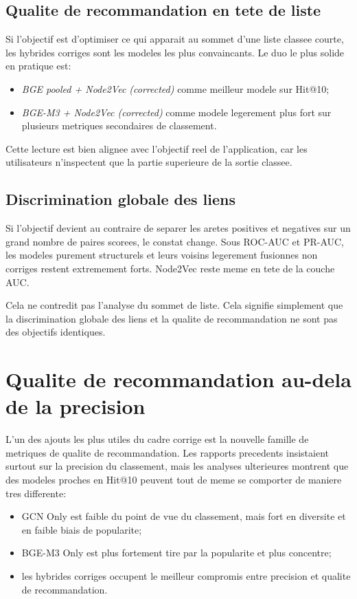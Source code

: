 \subsection{Qualite de recommandation en tete de liste}

Si l'objectif est d'optimiser ce qui apparait au sommet d'une liste classee
courte, les hybrides corriges sont les modeles les plus convaincants. Le duo
le plus solide en pratique est:
\begin{itemize}
    \item \textit{BGE pooled + Node2Vec (corrected)} comme meilleur modele sur
    Hit@10;
    \item \textit{BGE-M3 + Node2Vec (corrected)} comme modele legerement plus
    fort sur plusieurs metriques secondaires de classement.
\end{itemize}

Cette lecture est bien alignee avec l'objectif reel de l'application, car les
utilisateurs n'inspectent que la partie superieure de la sortie classee.

\subsection{Discrimination globale des liens}

Si l'objectif devient au contraire de separer les aretes positives et
negatives sur un grand nombre de paires scorees, le constat change. Sous
ROC-AUC et PR-AUC, les modeles purement structurels et leurs voisins legerement
fusionnes non corriges restent extremement forts. Node2Vec reste meme en tete
de la couche AUC.

Cela ne contredit pas l'analyse du sommet de liste. Cela signifie simplement
que la discrimination globale des liens et la qualite de recommandation ne sont
pas des objectifs identiques.

\section{Qualite de recommandation au-dela de la precision}

L'un des ajouts les plus utiles du cadre corrige est la nouvelle famille de
metriques de qualite de recommandation. Les rapports precedents insistaient
surtout sur la precision du classement, mais les analyses ulterieures montrent
que des modeles proches en Hit@10 peuvent tout de meme se comporter de maniere
tres differente:
\begin{itemize}
    \item GCN Only est faible du point de vue du classement, mais fort en
    diversite et en faible biais de popularite;
    \item BGE-M3 Only est plus fortement tire par la popularite et plus
    concentre;
    \item les hybrides corriges occupent le meilleur compromis entre precision
    et qualite de recommandation.
\end{itemize}

